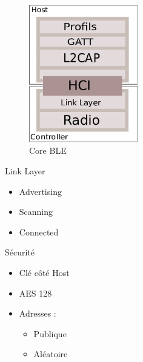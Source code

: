\begin{frame}

\begin{minipage}[t]{0.47\linewidth}
	\begin{figure}
		\includegraphics[height=6cm]{arch_core_ble.png}
		\caption{Core BLE}
	\end{figure}
\end{minipage}
\begin{minipage}[t]{0.45\linewidth}
	\begin{block}{Link Layer}
		\begin{itemize}
			\item Advertising
			\item Scanning
			\item Connected
		\end{itemize}
	\end{block}
	\begin{block}{Sécurité}
		\begin{itemize}
			\item Clé côté Host
			\item AES 128
			\item Adresses :
			\begin{itemize}
				\item Publique
				\item Aléatoire
			\end{itemize}
		\end{itemize}
	\end{block}
\end{minipage}
\end{frame}


